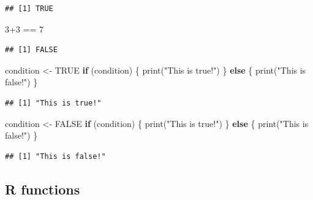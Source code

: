 \documentclass[
  12pt,
]{style/krantz}
\newenvironment{Shaded}{\begin{snugshade}}{\end{snugshade}}
\newcommand{\ConstantTok}[1]{\textcolor[rgb]{0.00,0.00,0.00}{#1}}
\newcommand{\ControlFlowTok}[1]{\textcolor[rgb]{0.13,0.29,0.53}{\textbf{#1}}}
\newcommand{\DecValTok}[1]{\textcolor[rgb]{0.00,0.00,0.81}{#1}}
\newcommand{\FunctionTok}[1]{\textcolor[rgb]{0.00,0.00,0.00}{#1}}
\newcommand{\NormalTok}[1]{#1}
\newcommand{\OtherTok}[1]{\textcolor[rgb]{0.56,0.35,0.01}{#1}}
\newcommand{\SpecialCharTok}[1]{\textcolor[rgb]{0.00,0.00,0.00}{#1}}
\newcommand{\StringTok}[1]{\textcolor[rgb]{0.31,0.60,0.02}{#1}}
\begin{document}
\begin{verbatim}
## [1] TRUE
\end{verbatim}

\begin{Shaded}
\begin{Highlighting}[]
\DecValTok{3}\SpecialCharTok{+}\DecValTok{3} \SpecialCharTok{==} \DecValTok{7}
\end{Highlighting}
\end{Shaded}

\begin{verbatim}
## [1] FALSE
\end{verbatim}

\begin{Shaded}
\begin{Highlighting}[]
\NormalTok{condition }\OtherTok{\textless{}{-}} \ConstantTok{TRUE}
\ControlFlowTok{if}\NormalTok{ (condition) \{}
     \FunctionTok{print}\NormalTok{(}\StringTok{"This is true!"}\NormalTok{)}
\NormalTok{\} }\ControlFlowTok{else}\NormalTok{ \{}
     \FunctionTok{print}\NormalTok{(}\StringTok{"This is false!"}\NormalTok{)}
\NormalTok{\}}
\end{Highlighting}
\end{Shaded}

\begin{verbatim}
## [1] "This is true!"
\end{verbatim}

\begin{Shaded}
\begin{Highlighting}[]
\NormalTok{condition }\OtherTok{\textless{}{-}} \ConstantTok{FALSE}
\ControlFlowTok{if}\NormalTok{ (condition) \{}
     \FunctionTok{print}\NormalTok{(}\StringTok{"This is true!"}\NormalTok{)}
\NormalTok{\} }\ControlFlowTok{else}\NormalTok{ \{}
     \FunctionTok{print}\NormalTok{(}\StringTok{"This is false!"}\NormalTok{)}
\NormalTok{\}}
\end{Highlighting}
\end{Shaded}

\begin{verbatim}
## [1] "This is false!"
\end{verbatim}

\hypertarget{r-functions}{%
\subsection{R functions}\label{r-functions}}
\end{document}
